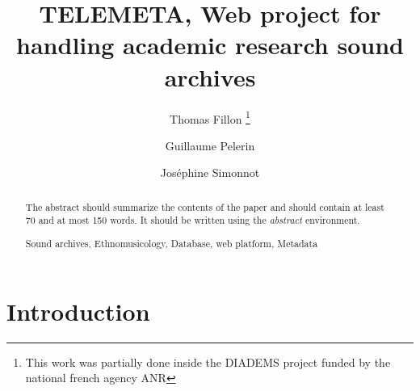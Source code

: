 \documentclass[runningheads,a4paper]{llncs}
\newcommand{\keywords}[1]{\par\addvspace\baselineskip
\noindent\keywordname\enspace\ignorespaces#1}
\begin{document}
\mainmatter  %

\title{TELEMETA, Web project for handling academic research sound archives}


%
%
\author{Thomas Fillon
%
\thanks{This work was partially done inside the DIADEMS project funded by the national french agency ANR }%
\and Guillaume Pelerin
 \and Jos{\'e}phine Simonnot
}
%


%
%

\maketitle


\begin{abstract}
The abstract should summarize the contents of the paper and should
contain at least 70 and at most 150 words. It should be written using the
\emph{abstract} environment.
\keywords{Sound archives, Ethnomusicology, Database, web platform, Metadata}
\end{abstract}


\section{Introduction}
\end{document}
